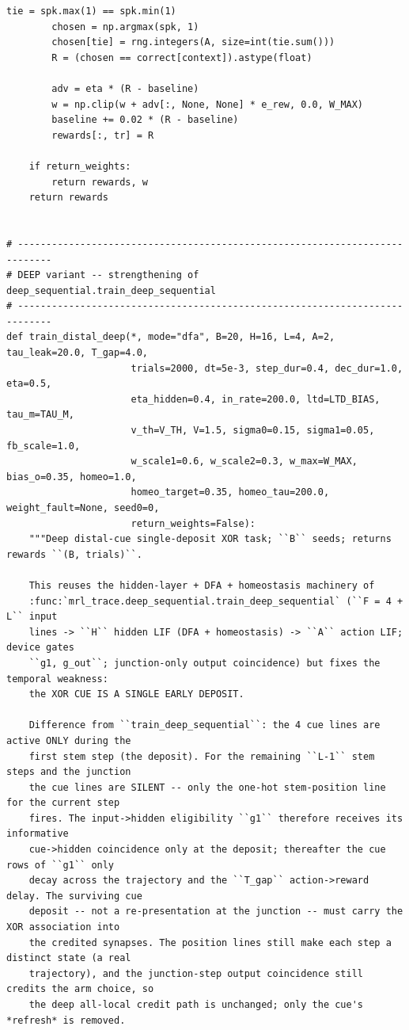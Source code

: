 \begin{lstlisting}[caption={mrl\_trace/distal\_cue.py},label={lst:siox-src-distal_cue}]
        tie = spk.max(1) == spk.min(1)
        chosen = np.argmax(spk, 1)
        chosen[tie] = rng.integers(A, size=int(tie.sum()))
        R = (chosen == correct[context]).astype(float)

        adv = eta * (R - baseline)
        w = np.clip(w + adv[:, None, None] * e_rew, 0.0, W_MAX)
        baseline += 0.02 * (R - baseline)
        rewards[:, tr] = R

    if return_weights:
        return rewards, w
    return rewards


# ----------------------------------------------------------------------------
# DEEP variant -- strengthening of deep_sequential.train_deep_sequential
# ----------------------------------------------------------------------------
def train_distal_deep(*, mode="dfa", B=20, H=16, L=4, A=2, tau_leak=20.0, T_gap=4.0,
                      trials=2000, dt=5e-3, step_dur=0.4, dec_dur=1.0, eta=0.5,
                      eta_hidden=0.4, in_rate=200.0, ltd=LTD_BIAS, tau_m=TAU_M,
                      v_th=V_TH, V=1.5, sigma0=0.15, sigma1=0.05, fb_scale=1.0,
                      w_scale1=0.6, w_scale2=0.3, w_max=W_MAX, bias_o=0.35, homeo=1.0,
                      homeo_target=0.35, homeo_tau=200.0, weight_fault=None, seed0=0,
                      return_weights=False):
    """Deep distal-cue single-deposit XOR task; ``B`` seeds; returns rewards ``(B, trials)``.

    This reuses the hidden-layer + DFA + homeostasis machinery of
    :func:`mrl_trace.deep_sequential.train_deep_sequential` (``F = 4 + L`` input
    lines -> ``H`` hidden LIF (DFA + homeostasis) -> ``A`` action LIF; device gates
    ``g1, g_out``; junction-only output coincidence) but fixes the temporal weakness:
    the XOR CUE IS A SINGLE EARLY DEPOSIT.

    Difference from ``train_deep_sequential``: the 4 cue lines are active ONLY during the
    first stem step (the deposit). For the remaining ``L-1`` stem steps and the junction
    the cue lines are SILENT -- only the one-hot stem-position line for the current step
    fires. The input->hidden eligibility ``g1`` therefore receives its informative
    cue->hidden coincidence only at the deposit; thereafter the cue rows of ``g1`` only
    decay across the trajectory and the ``T_gap`` action->reward delay. The surviving cue
    deposit -- not a re-presentation at the junction -- must carry the XOR association into
    the credited synapses. The position lines still make each step a distinct state (a real
    trajectory), and the junction-step output coincidence still credits the arm choice, so
    the deep all-local credit path is unchanged; only the cue's *refresh* is removed.


\end{lstlisting}
